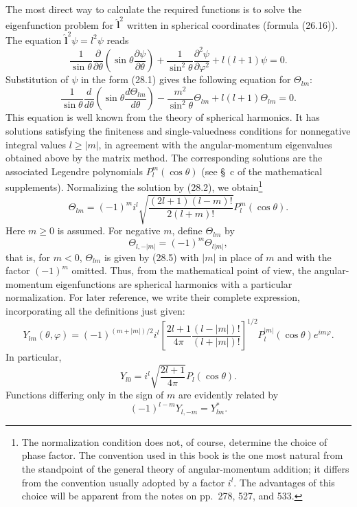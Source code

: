 The most direct way to calculate the required functions is to solve the
eigenfunction problem for $\hat{\mathbf l}^2$ written in spherical
coordinates (formula (26.16)). The equation
$\hat{\mathbf l}^2\psi=l^2\psi$ reads
\[
 \frac1{\sin\theta}\frac\partial{\partial\theta}
 \left(\sin\theta\frac{\partial\psi}{\partial\theta}\right)
 +\frac1{\sin^2\theta}\frac{\partial^2\psi}{\partial\varphi^2}
 +l(l+1)\psi=0.
\]
Substitution of $\psi$ in the form (28.1) gives the following equation for
$\Theta_{lm}$:
\begin{equation}
 \frac1{\sin\theta}\frac d{d\theta}
 \left(\sin\theta\frac{d\Theta_{lm}}{d\theta}\right)
 -\frac{m^2}{\sin^2\theta}\Theta_{lm}
 +l(l+1)\Theta_{lm}=0.
 \tag{28.4}
\end{equation}
This equation is well known from the theory of spherical harmonics. It has
solutions satisfying the finiteness and single-valuedness conditions for
nonnegative integral values $l\geq|m|$, in agreement with the
angular-momentum eigenvalues obtained above by the matrix method. The
corresponding solutions are the associated Legendre polynomials
$P_l^m(\cos\theta)$ (see \S~c of the mathematical supplements). Normalizing
the solution by (28.2), we obtain\footnote{The normalization condition does
not, of course, determine the choice of phase factor. The convention used in
this book is the one most natural from the standpoint of the general theory
of angular-momentum addition; it differs from the convention usually adopted
by a factor $i^l$. The advantages of this choice will be apparent from the
notes on pp.~278, 527, and 533.}
\begin{equation}
 \Theta_{lm}=(-1)^mi^l
 \sqrt{\frac{(2l+1)(l-m)!}{2(l+m)!}}P_l^m(\cos\theta).
 \tag{28.5}
\end{equation}
Here $m\geq0$ is assumed. For negative $m$, define $\Theta_{lm}$ by
\begin{equation}
  \Theta_{l,-|m|}=(-1)^m\Theta_{l|m|},
  \tag{28.6}
\end{equation}
that is, for $m<0$, $\Theta_{lm}$ is given by (28.5) with $|m|$ in place of
$m$ and with the factor $(-1)^m$ omitted.
Thus, from the mathematical point of view, the angular-momentum
eigenfunctions are spherical harmonics with a particular normalization. For
later reference, we write their complete expression, incorporating all the
definitions just given:
\begin{equation}
 Y_{lm}(\theta,\varphi)=(-1)^{(m+|m|)/2}i^l
 \left[\frac{2l+1}{4\pi}\frac{(l-|m|)!}{(l+|m|)!}\right]^{1/2}
 P_l^{|m|}(\cos\theta)e^{im\varphi}.
 \tag{28.7}
\end{equation}
In particular,
\begin{equation}
  Y_{l0}=i^l\sqrt{\frac{2l+1}{4\pi}}P_l(\cos\theta).
  \tag{28.8}
\end{equation}
Functions differing only in the sign of $m$ are evidently related by
\begin{equation}
  (-1)^{l-m}Y_{l,-m}=Y_{lm}^*.
  \tag{28.9}
\end{equation}

